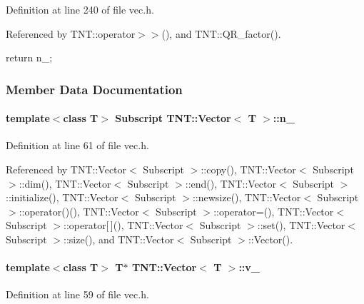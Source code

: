 Definition at line 240 of file vec.h.



Referenced by TNT::operator$>$$>$(), and TNT::QR\_\-factor().




\begin{DoxyCode}
    {
        return  n_; 
    }
\end{DoxyCode}




\subsubsection{Member Data Documentation}
\paragraph[{n\_\-}]{\setlength{\rightskip}{0pt plus 5cm}template$<$class T$>$ {\bf Subscript} {\bf TNT::Vector}$<$ T $>$::{\bf n\_\-}}\hfill\label{class_t_n_t_1_1_vector_accfd20cf0105ad3c153aeebf728f5bbc}


Definition at line 61 of file vec.h.



Referenced by TNT::Vector$<$ Subscript $>$::copy(), TNT::Vector$<$ Subscript $>$::dim(), TNT::Vector$<$ Subscript $>$::end(), TNT::Vector$<$ Subscript $>$::initialize(), TNT::Vector$<$ Subscript $>$::newsize(), TNT::Vector$<$ Subscript $>$::operator()(), TNT::Vector$<$ Subscript $>$::operator=(), TNT::Vector$<$ Subscript $>$::operator\mbox{[}$\,$\mbox{]}(), TNT::Vector$<$ Subscript $>$::set(), TNT::Vector$<$ Subscript $>$::size(), and TNT::Vector$<$ Subscript $>$::Vector().

\paragraph[{v\_\-}]{\setlength{\rightskip}{0pt plus 5cm}template$<$class T$>$ T$\ast$ {\bf TNT::Vector}$<$ T $>$::{\bf v\_\-}}\hfill\label{class_t_n_t_1_1_vector_a67b413bf6956350ff9dda9faee707433}


Definition at line 59 of file vec.h.



